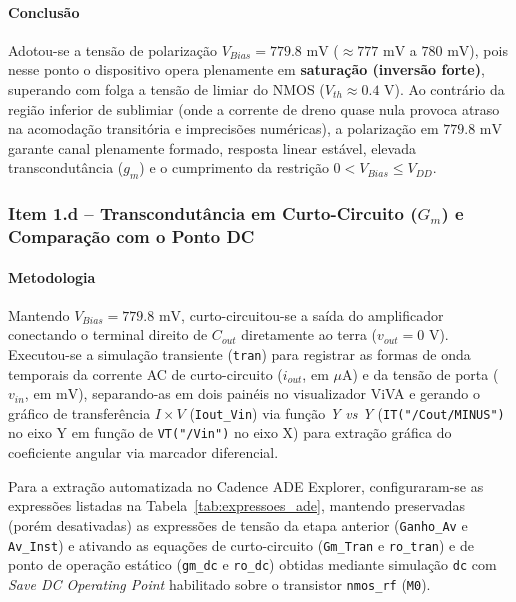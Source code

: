 \paragraph{Conclusão}
\vspace{0.2cm}
Adotou-se a tensão de polarização $V_{Bias} = 779.8\text{ mV}$ ($\approx 777\text{ mV}$ a $780\text{ mV}$), pois nesse ponto o dispositivo opera plenamente em \textbf{saturação (inversão forte)}, superando com folga a tensão de limiar do NMOS ($V_{th} \approx 0.4\text{ V}$). Ao contrário da região inferior de sublimiar (onde a corrente de dreno quase nula provoca atraso na acomodação transitória e imprecisões numéricas), a polarização em $779.8\text{ mV}$ garante canal plenamente formado, resposta linear estável, elevada transcondutância ($g_m$) e o cumprimento da restrição $0 < V_{Bias} \le V_{DD}$.

\subsubsection{Item 1.d -- Transcondutância em Curto-Circuito ($G_m$) e Comparação com o Ponto DC}

\paragraph{Metodologia}
\vspace{0.2cm}
Mantendo $V_{Bias} = 779.8\text{ mV}$, curto-circuitou-se a saída do amplificador conectando o terminal direito de $C_{out}$ diretamente ao terra ($v_{out} = 0\text{ V}$). Executou-se a simulação transiente (\texttt{tran}) para registrar as formas de onda temporais da corrente AC de curto-circuito ($i_{out}$, em $\mu\text{A}$) e da tensão de porta ($v_{in}$, em $\text{mV}$), separando-as em dois painéis no visualizador ViVA e gerando o gráfico de transferência $I \times V$ (\texttt{Iout\_Vin}) via função \textit{Y vs Y} (\texttt{IT("/Cout/MINUS")} no eixo Y em função de \texttt{VT("/Vin")} no eixo X) para extração gráfica do coeficiente angular via marcador diferencial.

Para a extração automatizada no Cadence ADE Explorer, configuraram-se as expressões listadas na Tabela~\ref{tab:expressoes_ade}, mantendo preservadas (porém desativadas) as expressões de tensão da etapa anterior (\texttt{Ganho\_Av} e \texttt{Av\_Inst}) e ativando as equações de curto-circuito (\texttt{Gm\_Tran} e \texttt{ro\_tran}) e de ponto de operação estático (\texttt{gm\_dc} e \texttt{ro\_dc}) obtidas mediante simulação \texttt{dc} com \textit{Save DC Operating Point} habilitado sobre o transistor \texttt{nmos\_rf} (\texttt{M0}).

